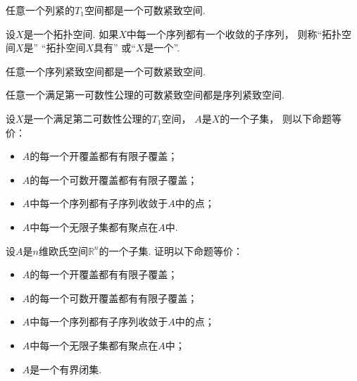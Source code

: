 \begin{theorem}
任意一个列紧的\(T_1\)空间都是一个可数紧致空间.
\end{theorem}

\begin{definition}
设\(X\)是一个拓扑空间.
如果\(X\)中每一个序列都有一个收敛的子序列，
则称“拓扑空间\(X\)是”
“拓扑空间\(X\)具有”
或“\(X\)是一个”.
\end{definition}

\begin{theorem}
任意一个序列紧致空间都是一个可数紧致空间.
\end{theorem}

\begin{theorem}
任意一个满足第一可数性公理的可数紧致空间都是序列紧致空间.
\end{theorem}

\begin{corollary}
设\(X\)是一个满足第二可数性公理的\(T_1\)空间，
\(A\)是\(X\)的一个子集，
则以下命题等价：\begin{itemize}
	\item \(A\)的每一个开覆盖都有有限子覆盖；
	\item \(A\)的每一个可数开覆盖都有有限子覆盖；
	\item \(A\)中每一个序列都有子序列收敛于\(A\)中的点；
	\item \(A\)中每一个无限子集都有聚点在\(A\)中.
\end{itemize}
\end{corollary}

\begin{example}
设\(A\)是\(n\)维欧氏空间\(\mathbb{R}^n\)的一个子集.
证明以下命题等价：\begin{itemize}
	\item \(A\)的每一个开覆盖都有有限子覆盖；
	\item \(A\)的每一个可数开覆盖都有有限子覆盖；
	\item \(A\)中每一个序列都有子序列收敛于\(A\)中的点；
	\item \(A\)中每一个无限子集都有聚点在\(A\)中；
	\item \(A\)是一个有界闭集.
\end{itemize}
\end{example}
